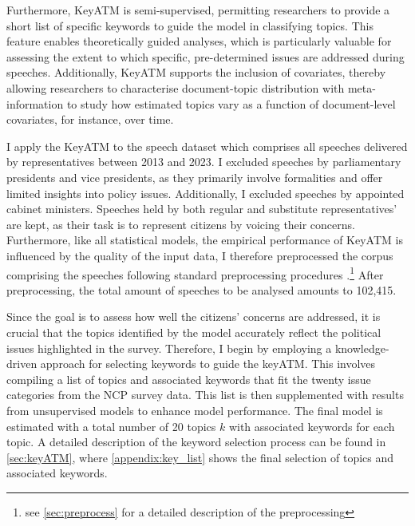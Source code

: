 Furthermore, KeyATM is semi-supervised, permitting researchers to provide a short list of specific keywords to guide the model in classifying topics. This feature enables theoretically guided analyses, which is particularly valuable for assessing the extent to which specific, pre-determined issues are addressed during speeches. Additionally, KeyATM supports the inclusion of covariates, thereby allowing researchers to characterise document-topic distribution with meta-information to study how estimated topics vary as a function of document-level covariates, for instance, over time.

I apply the KeyATM to the speech dataset which comprises all speeches delivered by representatives between 2013 and 2023. I excluded speeches by parliamentary presidents and vice presidents, as they primarily involve formalities and offer limited insights into policy issues. Additionally, I excluded speeches by appointed cabinet ministers. Speeches held by both regular and substitute representatives' are kept, as their task is to represent citizens by voicing their concerns. Furthermore, like all statistical models, the empirical performance of KeyATM is influenced by the quality of the input data, I therefore preprocessed the corpus comprising the speeches following standard preprocessing procedures \parencite[48-55]{grimmer_text_2022}.\footnote{see \cref{sec:preprocess} for a detailed description of the preprocessing} After preprocessing, the total amount of speeches to be analysed amounts to 102,415.

Since the goal is to assess how well the citizens' concerns are addressed, it is crucial that the topics identified by the model accurately reflect the political issues highlighted in the survey. Therefore, I begin by employing a knowledge-driven approach for selecting keywords to guide the keyATM. This involves compiling a list of topics and associated keywords that fit the twenty issue categories from the NCP survey data. This list is then supplemented with results from unsupervised models to enhance model performance. The final model is estimated with a total number of 20 topics $k$ with associated keywords for each topic. A detailed description of the keyword selection process can be found in \cref{sec:keyATM}, where \cref{appendix:key_list} shows the final selection of topics and associated keywords. 

